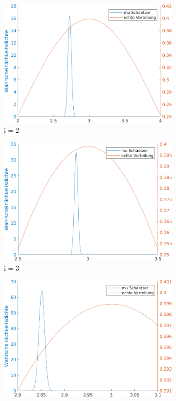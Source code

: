 \documentclass[a4paper]{scrartcl}
\begin{document}
\begin{figure}[H]
\begin{subfigure}{.5\textwidth}
			\includegraphics*[scale = 0.4]{assignment3_data/plots/q3_i2}
			\caption*{i = 2}
		\end{subfigure}%
		\begin{subfigure}{.5\textwidth}
			\centering
			\includegraphics*[scale = 0.4]{assignment3_data/plots/q3_i3}
			\caption*{i = 3}
		\end{subfigure}
		\begin{subfigure}{.5\textwidth}
			\centering
			\includegraphics*[scale = 0.4]{assignment3_data/plots/q3_i4}

\end{subfigure}
\end{figure}
\end{document}
